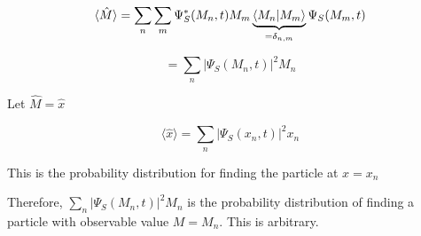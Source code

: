 \documentclass{article}
\begin{document}
$$\braket{\hat{M}} = \sum_n \sum_m \Psi_S^* (M_n,t) M_m \underbrace{\braket{M_n|M_m}}_{ = \delta_{n,m}} \Psi_S(M_m, t)$$

$$ = \sum_n |\Psi_S(M_n,t)|^2 M_n$$

Let $\hat{M} = \hat{x}$

$$\langle \hat{x}\rangle = \sum_n |\Psi_S(x_n,t)|^2 x_n$$

This is the probability distribution for finding the particle at $x = x_n$

Therefore, $\sum_n |\Psi_S(M_n,t)|^2 M_n$ is the probability distribution of finding a particle with observable value $M = M_n$. This is arbitrary. 





\end{document}
